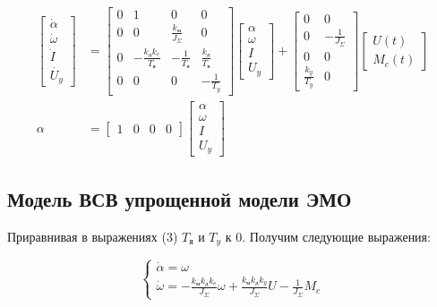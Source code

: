 \documentclass[a4paper, 12pt]{article}
\begin{document}
	\begin{align}
	\begin{bmatrix}
	\dot{\alpha} \\
	\dot{\omega} \\
	\dot{I} \\
	\dot{U_y} 
	\end{bmatrix} & = 
	\begin{bmatrix}
	0 & 1 & 0 & 0 \\
	0 & 0 & \frac{k_\text{м}}{J_\Sigma} & 0 \\
	0 & -\frac{k_\text{д}k_e}{T_\text{я}} & - \frac{1}{T_\text{я}} & \frac{k_\text{д}}{T_\text{я}} \\
	0 & 0 & 0 & -\frac{1}{T_y}
	\end{bmatrix}
	\begin{bmatrix}
	\alpha \\
	\omega \\
	I \\
	U_y 
	\end{bmatrix} + 
	\begin{bmatrix}
	0 & 0 \\
	0 & - \frac{1}{J_\Sigma} \\
	0 & 0 \\
	\frac{k_y}{T_y} & 0
	\end{bmatrix}
	\begin{bmatrix}
	U(t) \\
	M_c(t)
	\end{bmatrix} \\
	\alpha & = 
	\begin{bmatrix}
	1 & 0 & 0 & 0
	\end{bmatrix}
	\begin{bmatrix}
	\alpha \\
	\omega \\
	I \\
	U_y 
	\end{bmatrix}
	\end{align}
	
	\subsection{Модель ВСВ упрощенной модели ЭМО}
	\par Приравнивая в выражениях (3) $T_\text{я}$ и $T_y$ к 0. Получим следующие выражения:
	
	\begin{equation}
	\begin{cases}
	\dot{\alpha} = \omega \\
	\dot{\omega} = -\frac{k_\text{м}k_\text{д}k_e}{J_\Sigma}\omega + \frac{k_\text{м}k_\text{д}k_y}{J_\Sigma}U - \frac{1}{J_\Sigma}M_c
	\end{cases}
	\end{equation}
	
\end{document}
